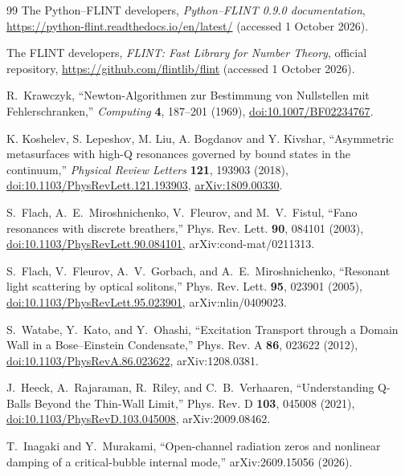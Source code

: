 \begin{thebibliography}{99}
The Python--FLINT developers, \emph{Python--FLINT 0.9.0 documentation},
\url{https://python-flint.readthedocs.io/en/latest/}
(accessed 1 October 2026).

The FLINT developers, \emph{FLINT: Fast Library for Number Theory},
official repository, \url{https://github.com/flintlib/flint}
(accessed 1 October 2026).

R.~Krawczyk, ``Newton-Algorithmen zur Bestimmung von Nullstellen mit
Fehlerschranken,'' \emph{Computing} \textbf{4}, 187--201 (1969),
\href{https://doi.org/10.1007/BF02234767}{doi:10.1007/BF02234767}.

K. Koshelev, S. Lepeshov, M. Liu, A. Bogdanov and Y. Kivshar,
``Asymmetric metasurfaces with high-Q resonances governed by bound states
in the continuum,'' \emph{Physical Review Letters} \textbf{121}, 193903 (2018),
\href{https://doi.org/10.1103/PhysRevLett.121.193903}{doi:10.1103/PhysRevLett.121.193903},
\href{https://arxiv.org/abs/1809.00330}{arXiv:1809.00330}.

S.~Flach, A.~E.~Miroshnichenko, V.~Fleurov, and M.~V.~Fistul,
``Fano resonances with discrete breathers,''
Phys. Rev. Lett. \textbf{90}, 084101 (2003),
\href{https://doi.org/10.1103/PhysRevLett.90.084101}{doi:10.1103/PhysRevLett.90.084101},
arXiv:cond-mat/0211313.

S.~Flach, V.~Fleurov, A.~V.~Gorbach, and A.~E.~Miroshnichenko,
``Resonant light scattering by optical solitons,''
Phys. Rev. Lett. \textbf{95}, 023901 (2005),
\href{https://doi.org/10.1103/PhysRevLett.95.023901}{doi:10.1103/PhysRevLett.95.023901},
arXiv:nlin/0409023.

S.~Watabe, Y.~Kato, and Y.~Ohashi,
``Excitation Transport through a Domain Wall in a Bose--Einstein Condensate,''
Phys. Rev. A \textbf{86}, 023622 (2012),
\href{https://doi.org/10.1103/PhysRevA.86.023622}{doi:10.1103/PhysRevA.86.023622},
arXiv:1208.0381.

J.~Heeck, A.~Rajaraman, R.~Riley, and C.~B.~Verhaaren,
``Understanding Q-Balls Beyond the Thin-Wall Limit,''
Phys. Rev. D \textbf{103}, 045008 (2021),
\href{https://doi.org/10.1103/PhysRevD.103.045008}{doi:10.1103/PhysRevD.103.045008},
arXiv:2009.08462.

T.~Inagaki and Y.~Murakami,
``Open-channel radiation zeros and nonlinear damping of a critical-bubble
internal mode,'' arXiv:2609.15056 (2026).


\end{thebibliography}
